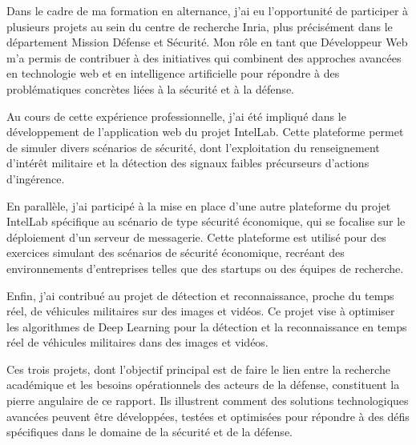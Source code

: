 


%
%
\sloppy

Dans le cadre de ma formation en alternance, j'ai eu l'opportunité de participer à plusieurs projets au sein du centre de recherche Inria, plus précisément dans le département Mission Défense et Sécurité. Mon rôle en tant que Développeur Web m'a permis de contribuer à des initiatives qui combinent des approches avancées en technologie web et en intelligence artificielle pour répondre à des problématiques concrètes liées à la sécurité et à la défense.

Au cours de cette expérience professionnelle, j'ai été impliqué dans le développement de l'application web du projet IntelLab. Cette plateforme permet de simuler divers scénarios de sécurité, dont l'exploitation du renseignement d'intérêt militaire et la détection des signaux faibles précurseurs d'actions d'ingérence.

En parallèle, j'ai participé à la mise en place d'une autre plateforme du projet IntelLab spécifique au scénario de type sécurité économique, qui se focalise sur le déploiement d'un serveur de messagerie. Cette plateforme est utilisé pour des exercices simulant des scénarios de sécurité économique, recréant des environnements d'entreprises telles que des startups ou des équipes de recherche.

Enfin, j'ai contribué au projet de détection et reconnaissance, proche du temps réel, de véhicules militaires sur des images et vidéos. Ce projet vise à optimiser les algorithmes de Deep Learning pour la détection et la reconnaissance en temps réel de véhicules militaires dans des images et vidéos.

Ces trois projets, dont l'objectif principal est de faire le lien entre la recherche académique et les besoins opérationnels des acteurs de la défense, constituent la pierre angulaire de ce rapport. Ils illustrent comment des solutions technologiques avancées peuvent être développées, testées et optimisées pour répondre à des défis spécifiques dans le domaine de la sécurité et de la défense.

